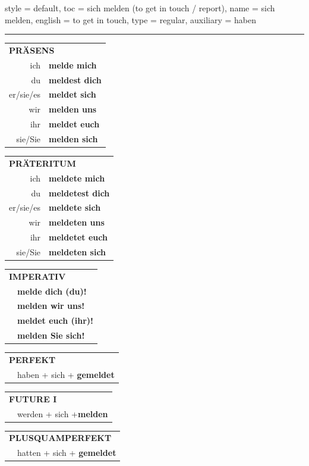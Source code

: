 \begin{verbentry}{
  style = {default},
  toc = {sich melden (to get in touch / report)},
  name = {sich melden},
  english = {to get in touch},
  type = {regular},
  auxiliary = {haben}
}


\vspace{5pt}
\hrule
\vspace{5pt}

\begin{tabular}{rl}
\multicolumn{2}{l}{\textbf{PRÄSENS}}\\
ich & \textbf{melde mich}\\
du & \textbf{meldest dich}\\
er/sie/es & \textbf{meldet sich}\\
wir & \textbf{melden uns}\\
ihr & \textbf{meldet euch}\\
sie/Sie & \textbf{melden sich}\\
\end{tabular}
\hfill
\begin{tabular}{rl}
\multicolumn{2}{l}{\textbf{PRÄTERITUM}}\\
ich & \textbf{meldete mich}\\
du & \textbf{meldetest dich}\\
er/sie/es & \textbf{meldete sich}\\
wir & \textbf{meldeten uns}\\
ihr & \textbf{meldetet euch}\\
sie/Sie & \textbf{meldeten sich}\\
\end{tabular}
\hfill
\begin{tabular}{rl}
\multicolumn{2}{l}{\textbf{IMPERATIV}}\\
& \textbf{melde dich (du)!}\\
& \textbf{melden wir uns!}\\
& \textbf{meldet euch (ihr)!}\\
& \textbf{melden Sie sich!}\\
\end{tabular}

\vspace{10pt}

\begin{tabular}{rl}
\multicolumn{2}{l}{\textbf{PERFEKT}}\\
& haben + sich + \textbf{gemeldet}\\
\end{tabular}
\hfill
\begin{tabular}{rl}
\multicolumn{2}{l}{\textbf{FUTURE I}}\\
& werden + sich +\textbf{melden}\\
\end{tabular}
\hfill
\begin{tabular}{rl}
\multicolumn{2}{l}{\textbf{PLUSQUAMPERFEKT}}\\
& hatten + sich + \textbf{gemeldet}\\
\end{tabular}


\end{verbentry}
